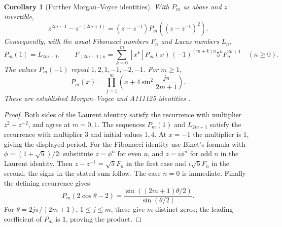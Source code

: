 \documentclass[11pt]{article}
\newtheorem{corollary}[theorem]{Corollary}
\begin{document}
\begin{corollary}[Further Morgan--Voyce identities]\label{cor:morgan-siblings}
With $P_m$ as above and $z$ invertible,
\[
z^{2m+1}-z^{-(2m+1)}=(z-z^{-1})P_m((z-z^{-1})^2).
\]
Consequently, with the usual Fibonacci numbers $F_n$ and Lucas numbers $L_n$,
\[
P_m(1)=L_{2m+1},\qquad
F_{(2m+1)n}=\sum_{k=0}^m[x^k]P_m(x)\,
(-1)^{(m+k)n}5^kF_n^{2k+1}\quad(n\geq0).
\]
The values $P_m(-1)$ repeat $1,2,1,-1,-2,-1$. For $m\geq1$,
\[
P_m(x)=\prod_{j=1}^m\left(x+4\sin^2\frac{j\pi}{2m+1}\right).
\]
These are established Morgan--Voyce and A111125 identities
\cite{andre,related-arrays}.
\end{corollary}
\begin{proof}
Both sides of the Laurent identity satisfy the recurrence with multiplier
$z^2+z^{-2}$, and agree at $m=0,1$.
The sequences $P_m(1)$ and $L_{2m+1}$ satisfy the recurrence with multiplier
$3$ and initial values $1,4$. At $x=-1$ the multiplier is $1$, giving
the displayed period. For the Fibonacci identity use Binet's formula with
$\phi=(1+\sqrt5)/2$: substitute $z=\phi^n$ for even $n$, and
$z=i\phi^n$ for odd $n$ in the Laurent identity. Then
$z-z^{-1}=\sqrt5 F_n$ in the first case and $i\sqrt5 F_n$ in the second;
the signs in the stated sum follow. The case $n=0$ is immediate.
Finally the defining recurrence gives
\[
P_m(2\cos\theta-2)=\frac{\sin((2m+1)\theta/2)}{\sin(\theta/2)}.
\]
For $\theta=2j\pi/(2m+1)$, $1\leq j\leq m$, these give $m$ distinct
zeros; the leading coefficient of $P_m$ is $1$, proving the product.
\end{proof}
\end{document}
